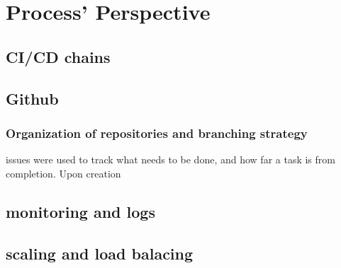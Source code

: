 \section{Process' Perspective}
\label{sec:process_perspective}



\subsection{CI/CD chains}


\subsection{Github}

\subsubsection{Organization of repositories and branching strategy}
issues were used to track what needs to be done, and how far a task is from completion. Upon creation


\subsection{monitoring and logs}

\subsection{scaling and load balacing}
